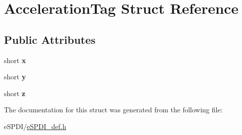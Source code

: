 \hypertarget{struct_acceleration_tag}{}\section{Acceleration\+Tag Struct Reference}
\label{struct_acceleration_tag}
\subsection*{Public Attributes}
\begin{DoxyCompactItemize}
\item 
\mbox{\label{struct_acceleration_tag_a0d588ca45932f3b28561ed8a71339fb5}} 
short {\bfseries x}
\item 
\mbox{\label{struct_acceleration_tag_a08b21bef151cca5823b126ed43f55c0c}} 
short {\bfseries y}
\item 
\mbox{\label{struct_acceleration_tag_abb05b42f0e2456aa8ef07b83bee8eed2}} 
short {\bfseries z}
\end{DoxyCompactItemize}


The documentation for this struct was generated from the following file\+:\begin{DoxyCompactItemize}
\item 
e\+S\+P\+D\+I/\hyperlink{e_s_p_d_i__def_8h}{e\+S\+P\+D\+I\+\_\+def.\+h}\end{DoxyCompactItemize}

